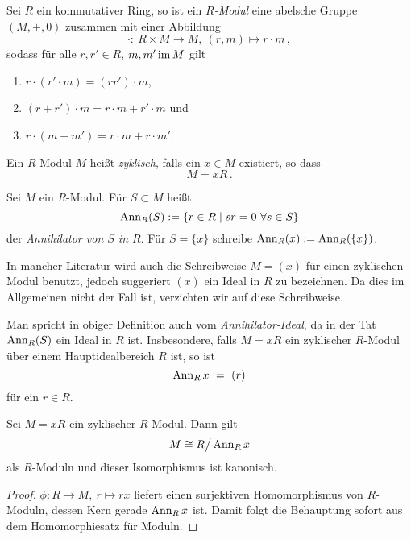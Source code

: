 \begin{definition}[Modul]
  Sei $R$ ein kommutativer Ring, so ist ein \emph{$R$-Modul}
  eine abelsche Gruppe $(M,+,0)$ zusammen mit einer 
  Abbildung 
  \[ \cdot:\ R \times M \to M,\ (r,m) \mapsto r\cdot m\,,\]
  sodass für alle $r, r' \in R$, $m,m' \operatorname{im} M$ gilt
  \begin{enumerate}
    \item $r\cdot (r'\cdot m) = (rr')\cdot m$,
    \item $(r+r')\cdot m = r\cdot m + r'\cdot m$ und 
    \item $r\cdot(m+m') = r\cdot m + r\cdot m'$.
  \end{enumerate}
\end{definition}


\begin{definition}
  Ein $R$-Modul $M$ heißt \emph{zyklisch}, falls
  ein $x\in M$ existiert, so dass
  \[ M = xR\,.\]
\end{definition}

\begin{definition}[Annihilator]
  Sei $M$ ein $R$-Modul. Für $S\subset M$ heißt
  \[ \Ann_R(S) := \{ r \in R \mid sr = 0\ \forall s\in S\}\]
  der \emph{Annihilator von $S$ in $R$}. 
  Für $S= \{x\}$ schreibe $\operatorname{Ann}_R(x) := \operatorname{Ann}_R(\{x\})$.
\end{definition}

\begin{bemerkung}
  In mancher Literatur wird auch die Schreibweise $M = (x)$ für einen
  zyklischen Modul benutzt, jedoch suggeriert $(x)$ ein Ideal in $R$ zu
  bezeichnen. Da dies im Allgemeinen nicht der Fall ist, verzichten wir auf
  diese Schreibweise.
\end{bemerkung}

\begin{bemerkung}
  Man spricht in obiger Definition auch vom \emph{Annihilator-Ideal}, da in der
  Tat $\operatorname{Ann}_R(S)$ ein Ideal in $R$ ist. Insbesondere, falls 
  $M = xR$ ein zyklischer $R$-Modul über einem Hauptidealbereich $R$ ist, so
  ist 
  \[ \operatorname{Ann}_R x \ =\  (r)\]
  für ein $r\in R$.
\end{bemerkung}


\begin{lemma}
  Sei $M = xR$ ein zyklischer $R$-Modul. Dann gilt
  \[M \cong R\big/\operatorname{Ann}_Rx\]
  als $R$-Moduln und dieser Isomorphismus ist kanonisch.
\end{lemma}
\begin{proof}
  $\phi:R \to M,\ r \mapsto rx$ liefert einen surjektiven Homomorphismus von
  $R$-Moduln, dessen Kern gerade $\operatorname{Ann}_Rx$ ist. Damit folgt die Behauptung
  sofort aus dem Homomorphiesatz für Moduln.
\end{proof}

